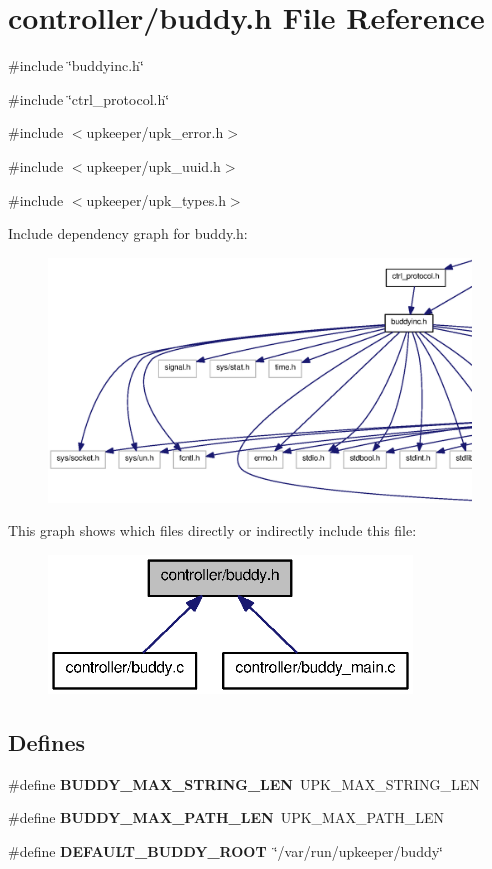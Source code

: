 \section{controller/buddy.h File Reference}
\label{buddy_8h}
{\ttfamily \#include \char`\"{}buddyinc.h\char`\"{}}\par
{\ttfamily \#include \char`\"{}ctrl\_\-protocol.h\char`\"{}}\par
{\ttfamily \#include $<$upkeeper/upk\_\-error.h$>$}\par
{\ttfamily \#include $<$upkeeper/upk\_\-uuid.h$>$}\par
{\ttfamily \#include $<$upkeeper/upk\_\-types.h$>$}\par
Include dependency graph for buddy.h:
\nopagebreak
\begin{figure}[H]
\begin{center}
\leavevmode
\includegraphics[width=400pt]{buddy_8h__incl}
\end{center}
\end{figure}
This graph shows which files directly or indirectly include this file:\nopagebreak
\begin{figure}[H]
\begin{center}
\leavevmode
\includegraphics[width=274pt]{buddy_8h__dep__incl}
\end{center}
\end{figure}
\subsection*{Defines}
\begin{DoxyCompactItemize}
\item 
\#define {\bf BUDDY\_\-MAX\_\-STRING\_\-LEN}~UPK\_\-MAX\_\-STRING\_\-LEN
\item 
\#define {\bf BUDDY\_\-MAX\_\-PATH\_\-LEN}~UPK\_\-MAX\_\-PATH\_\-LEN
\item 
\#define {\bf DEFAULT\_\-BUDDY\_\-ROOT}~\char`\"{}/var/run/upkeeper/buddy\char`\"{}
\end{DoxyCompactItemize}
